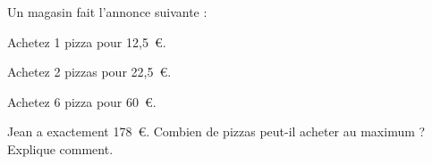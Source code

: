 Un magasin fait l'annonce suivante :
\begin{center}
  Achetez 1 pizza pour 12,5~\textgreek{\euro}.
\par Achetez 2 pizzas pour 22,5~\textgreek{\euro}.
\par Achetez 6 pizza pour 60~\textgreek{\euro}.
\end{center}
Jean a exactement 178~\textgreek{\euro}. Combien de pizzas peut-il acheter au maximum ? Explique comment.